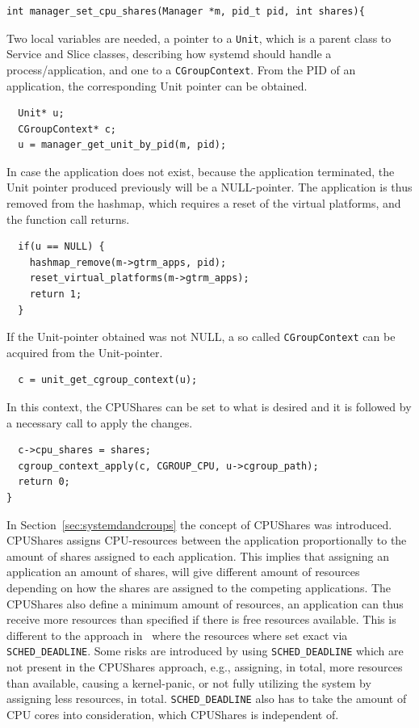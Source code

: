 \documentclass[nobiblatex]{LTHthesis}
\begin{document}
\begin{lstlisting}
int manager_set_cpu_shares(Manager *m, pid_t pid, int shares){
\end{lstlisting}
Two local variables are needed, a pointer to a \texttt{Unit}, which is a parent class to Service and Slice classes, describing how systemd should handle a process/application, and one to a 
\texttt{CGroupContext}. From the PID of an application, the corresponding 
Unit pointer can be obtained.
\begin{lstlisting}
  Unit* u;
  CGroupContext* c;
  u = manager_get_unit_by_pid(m, pid);
\end{lstlisting}
In case the application does not exist, because the application terminated,
the Unit pointer produced previously will be a NULL-pointer. The application
is thus removed from the hashmap, which requires a reset of the virtual
platforms, and the function call returns.
\begin{lstlisting}
  if(u == NULL) {
	hashmap_remove(m->gtrm_apps, pid);
	reset_virtual_platforms(m->gtrm_apps);
	return 1;
  }
\end{lstlisting}

If the Unit-pointer obtained was not NULL, a so called \texttt{CGroupContext}
can be acquired from the Unit-pointer.
\begin{lstlisting}
  c = unit_get_cgroup_context(u);
\end{lstlisting}
In this context, the CPUShares can be set to what is desired and it is
followed by a necessary call to apply the changes.
\begin{lstlisting}
  c->cpu_shares = shares;
  cgroup_context_apply(c, CGROUP_CPU, u->cgroup_path);
  return 0;
}
\end{lstlisting}

In Section~\ref{sec:systemdandcroups} the concept of CPUShares was introduced. 
CPUShares assigns CPU-resources between the application proportionally to the amount of shares 
assigned to each application. This implies that assigning an application an 
amount of shares, will give different amount of resources depending on how the 
shares are assigned to the competing applications. The CPUShares also define a 
minimum amount of resources, an application can thus receive more resources 
than specified if there is free resources available. This is different to the 
approach in~\cite{gtrm} where the resources where set exact via 
\texttt{SCHED\_DEADLINE}. Some risks are introduced by using 
\texttt{SCHED\_DEADLINE} which are not present in the CPUShares approach, e.g., 
assigning, in total, more resources than available, causing a kernel-panic, 
or not fully utilizing the system by assigning less resources, in total. 
\texttt{SCHED\_DEADLINE} also has to take the amount of CPU cores into 
consideration, which CPUShares is independent of.
\end{document}
